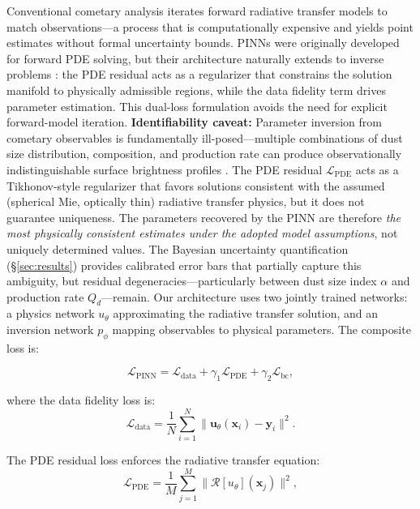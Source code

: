 \documentclass[preprint2]{aastex631}
\begin{document}
Conventional cometary analysis iterates forward radiative transfer models to match observations---a process that is computationally expensive and yields point estimates without formal uncertainty bounds. PINNs \citep{raissi19} were originally developed for forward PDE solving, but their architecture naturally extends to inverse problems \citep{lu21}: the PDE residual acts as a regularizer that constrains the solution manifold to physically admissible regions, while the data fidelity term drives parameter estimation. This dual-loss formulation avoids the need for explicit forward-model iteration. \textbf{Identifiability caveat:} Parameter inversion from cometary observables is fundamentally ill-posed---multiple combinations of dust size distribution, composition, and production rate can produce observationally indistinguishable surface brightness profiles \citep{fulle10}. The PDE residual $\mathcal{L}_{\text{PDE}}$ acts as a Tikhonov-style regularizer that favors solutions consistent with the assumed (spherical Mie, optically thin) radiative transfer physics, but it does not guarantee uniqueness. The parameters recovered by the PINN are therefore \textit{the most physically consistent estimates under the adopted model assumptions}, not uniquely determined values. The Bayesian uncertainty quantification (§\ref{sec:results}) provides calibrated error bars that partially capture this ambiguity, but residual degeneracies---particularly between dust size index $\alpha$ and production rate $Q_d$---remain. Our architecture uses two jointly trained networks: a physics network $u_\theta$ approximating the radiative transfer solution, and an inversion network $p_\phi$ mapping observables to physical parameters. The composite loss is:

\begin{equation}\label{eq:pinn_loss}
\mathcal{L}_{\text{PINN}} = \mathcal{L}_{\text{data}} + \gamma_1 \mathcal{L}_{\text{PDE}} + \gamma_2 \mathcal{L}_{\text{bc}},
\end{equation}

where the data fidelity loss is:
\begin{equation}\label{eq:data_loss}
\mathcal{L}_{\text{data}} = \frac{1}{N} \sum_{i=1}^{N} \|\mathbf{u}_\theta(\mathbf{x}_i) - \mathbf{y}_i\|^2.
\end{equation}

The PDE residual loss enforces the radiative transfer equation:
\begin{equation}\label{eq:pde_loss}
\mathcal{L}_{\text{PDE}} = \frac{1}{M} \sum_{j=1}^{M} \|\mathcal{R}[u_\theta](\mathbf{x}_j)\|^2,
\end{equation}
\end{document}
